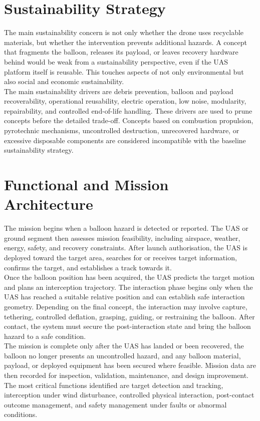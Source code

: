 \section*{Sustainability Strategy}

The main sustainability concern is not only whether the drone uses recyclable materials, but whether the intervention prevents additional hazards. A concept that fragments the balloon, releases its payload, or leaves recovery hardware behind would be weak from a sustainability perspective, even if the UAS platform itself is reusable. This touches aspects of not only environmental but also social and economic sustainability.
\\

The main sustainability drivers are debris prevention, balloon and payload recoverability, operational reusability, electric operation, low noise, modularity, repairability, and controlled end-of-life handling. These drivers are used to prune concepts before the detailed trade-off. Concepts based on combustion propulsion, pyrotechnic mechanisms, uncontrolled destruction, unrecovered hardware, or excessive disposable components are considered incompatible with the baseline sustainability strategy.

\section*{Functional and Mission Architecture}

The mission begins when a balloon hazard is detected or reported. The UAS or ground segment then assesses mission feasibility, including airspace, weather, energy, safety, and recovery constraints. After launch authorisation, the UAS is deployed toward the target area, searches for or receives target information, confirms the target, and establishes a track towards it.
\\

Once the balloon position has been acquired, the UAS predicts the target motion and plans an interception trajectory. The interaction phase begins only when the UAS has reached a suitable relative position and can establish safe interaction geometry. Depending on the final concept, the interaction may involve capture, tethering, controlled deflation, grasping, guiding, or restraining the balloon. After contact, the system must secure the post-interaction state and bring the balloon hazard to a safe condition.
\\

The mission is complete only after the UAS has landed or been recovered, the balloon no longer presents an uncontrolled hazard, and any balloon material, payload, or deployed equipment has been secured where feasible. Mission data are then recorded for inspection, validation, maintenance, and design improvement.
The most critical functions identified are target detection and tracking, interception under wind disturbance, controlled physical interaction, post-contact outcome management, and safety management under faults or abnormal conditions.

